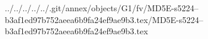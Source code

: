 ../../../../../.git/annex/objects/G1/fv/MD5E-s5224--b3af1ed97b752aeea6b9fa24ef9ae9b3.tex/MD5E-s5224--b3af1ed97b752aeea6b9fa24ef9ae9b3.tex